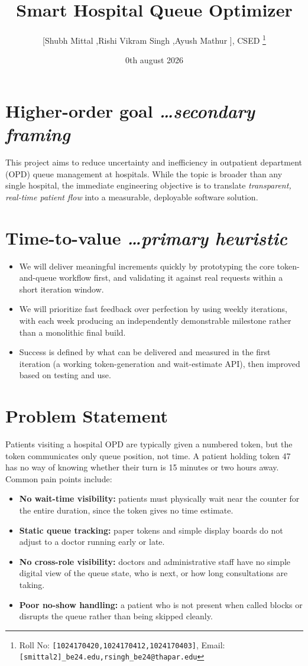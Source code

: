 \documentclass[11pt,a4paper]{article}
\title{Smart Hospital Queue Optimizer}
\author{
  [Shubh Mittal ,Rishi Vikram Singh ,Ayush Mathur ], CSED%
  \thanks{Roll No: \texttt{[1024170420,1024170412,1024170403]}, %
    Email: \texttt{[smittal2]\_be24\@thapar.edu,rsingh_be24@thapar.edu}}
}
\date{\20th august 2026}
\newcommand{\BvrHint}[1]{%
  {\normalfont\normalsize\itshape\hfill #1}}
\begin{document}
\maketitle

\section{Higher-order goal%
  \BvrHint{\ldots secondary framing}}
This project aims to reduce uncertainty and inefficiency in outpatient department (OPD) queue management at hospitals. While the topic is broader than any single hospital, the immediate engineering objective is to translate \emph{transparent, real-time patient flow} into a measurable, deployable software solution.

\section{Time-to-value %
\BvrHint{\ldots primary heuristic}}
\begin{itemize}[leftmargin=0.7cm]
    \item We will deliver meaningful increments quickly by prototyping the core token-and-queue workflow first, and validating it against real requests within a short iteration window.
    \item We will prioritize fast feedback over perfection by using weekly iterations, with each week producing an independently demonstrable milestone rather than a monolithic final build.
    \item Success is defined by what can be delivered and measured in the first iteration (a working token-generation and wait-estimate API), then improved based on testing and use.
\end{itemize}

\section{Problem Statement}
Patients visiting a hospital OPD are typically given a numbered token, but the token communicates only queue position, not time. A patient holding token 47 has no way of knowing whether their turn is 15 minutes or two hours away. Common pain points include:
\begin{itemize}[leftmargin=0.7cm]
    \item \textbf{No wait-time visibility:} patients must physically wait near the counter for the entire duration, since the token gives no time estimate.
    \item \textbf{Static queue tracking:} paper tokens and simple display boards do not adjust to a doctor running early or late.
    \item \textbf{No cross-role visibility:} doctors and administrative staff have no simple digital view of the queue state, who is next, or how long consultations are taking.
    \item \textbf{Poor no-show handling:} a patient who is not present when called blocks or disrupts the queue rather than being skipped cleanly.
\end{itemize}
\end{document}
